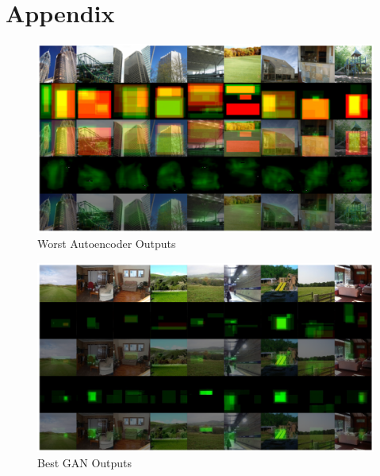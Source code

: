 \documentclass{UoYCSproject}
\begin{document}

\chapter{Appendix}

\begin{figure}[ht]
    \centering
    \includegraphics[width=\linewidth]{Worst autoencoder Outputs}
    \caption{Worst Autoencoder Outputs}
    \label{fig:autoencoderWorstOutput}
\end{figure}

\begin{figure}[ht]
    \centering
    \includegraphics[width=\linewidth]{Best GAN Outputs}
    \caption{Best GAN Outputs}
    \label{fig:GANBestOutput}
\end{figure}
\end{document}
